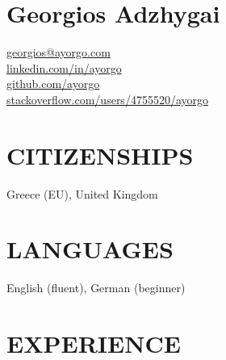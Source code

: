 \documentclass[a4paper,10pt]{article}
\begin{document}
\section*{\Large Georgios Adzhygai}

\begin{tabbing}
\faEnvelope[regular] \= \href{mailto:georgios@ayorgo.com}{georgios@ayorgo.com} \\
\faLinkedin \> \href{https://www.linkedin.com/in/ayorgo}{linkedin.com/in/ayorgo} \\
\faGithub \> \href{https://github.com/ayorgo}{github.com/ayorgo} \\
\faStackOverflow \> \href{https://stackoverflow.com/users/4755520/ayorgo}{stackoverflow.com/users/4755520/ayorgo}
\end{tabbing}

\section*{CITIZENSHIPS}
Greece (EU), United Kingdom

\section*{LANGUAGES}
English (fluent), German (beginner)

\section*{EXPERIENCE}
\end{document}
